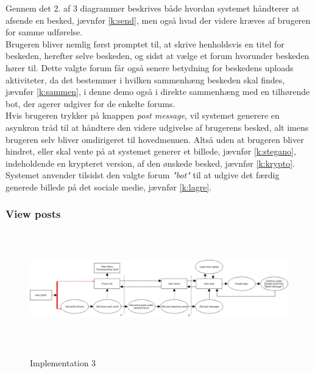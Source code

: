 Gennem det 2. af 3 diagrammer beskrives både hvordan systemet håndterer at afsende en besked, jævnfør \ref{k:send}, men også hvad der videre kræves af brugeren for samme udførelse.\\
Brugeren bliver nemlig først promptet til, at skrive henholdsvis en titel for beskeden, herefter selve beskeden, og sidst at vælge et forum hvorunder beskeden hører til. Dette valgte forum får også senere betydning for beskedens uploads aktiviteter, da det bestemmer i hvilken sammenhæng beskeden skal findes, jævnfør \ref{k:sammen}, i denne demo også i direkte sammenhæng med en tilhørende bot, der agerer udgiver for de enkelte forums.\\
Hvis brugeren trykker på knappen \textit{post message}, vil systemet generere en asynkron tråd til at håndtere den videre udgivelse af brugerens besked, alt imens brugeren selv bliver omdirigeret til hovedmenuen.
Altså uden at brugeren bliver hindret, eller skal vente på at systemet generer et billede, jævnfør \ref{k:stegano}, indeholdende en krypteret version, af den ønskede besked, jævnfør \ref{k:krypto}. Systemet anvender tilsidst den valgte forum \textit{"bot"} til at udgive det færdig generede billede på det sociale medie, jævnfør \ref{k:lagre}.

\subsubsection{View posts}
\begin{figure}[H]
    \centering
    \includegraphics[width=1\textwidth, height=5cm]{Projectdoc/Assets/Illustrationer/Implementation-billede3.png}
    \label{fig:implementation3}
    \caption{Implementation 3}
\end{figure}

